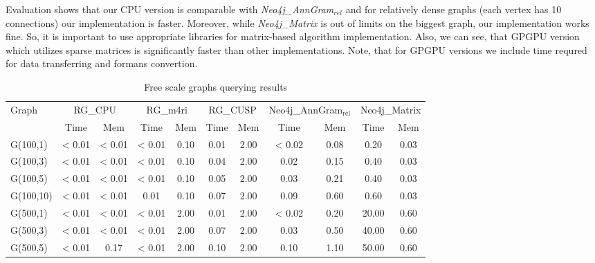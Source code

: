 Evaluation shows that our CPU version is comparable with \textit{Neo4j\_AnnGram$_{\textit{rel}}$} and for relatively dense graphs (each vertex has 10 connections) our implementation is faster. Moreover, while \textit{Neo4j\_Matrix} is out of limits on the biggest graph, our implementation works fine.
So, it is important to use appropriate libraries for matrix-based algorithm implementation.
Also, we can see, that GPGPU version which utilizes sparse matrices is significantly faster than other implementations.
Note, that for GPGPU versions we include time requred for data transferring and formans convertion.

\begin{table*}
\caption{Free scale graphs querying results}
\label{tbl:tableFreeScale}
\begin{tabular}{| l | c  c | c  c | c  c | c  c | c  c |}
    \hline
    \multirow{2}{*}{Graph} & \multicolumn{2}{|c|}{RG\_CPU} & \multicolumn{2}{|c|}{RG\_m4ri} & \multicolumn{2}{|c|}{RG\_CUSP} &\multicolumn{2}{|c|}{Neo4j\_AnnGram$_{\text{rel}}$} &\multicolumn{2}{|c|}{Neo4j\_Matrix} \\
    \cline{2-11}
                  & Time     & Mem             & Time   & Mem          & Time     & Mem         & Time    & Mem         & Time    & Mem\\
    \hline
    \hline
    G(100,1)      & < 0.01  & < 0.01           & < 0.01  & 0.10        & 0.01   & 2.00          & < 0.02  & 0.08      & 0.20     & 0.03  \\
    G(100,3)      & < 0.01  & < 0.01           & < 0.01  & 0.10        & 0.04   & 2.00          & 0.02    & 0.15      & 0.40     & 0.03  \\
    G(100,5)      & < 0.01  & < 0.01           & < 0.01  & 0.10        & 0.05   & 2.00          & 0.03    & 0.21      & 0.40     & 0.03  \\
    G(100,10)     & < 0.01  & < 0.01           & 0.01    & 0.10        & 0.07   & 2.00          & 0.09    & 0.60      & 0.60     & 0.03  \\
    \hline
    G(500,1)      & < 0.01  & < 0.01           & < 0.01  & 2.00        & 0.01   & 2.00          & < 0.02  & 0.20      & 20.00    & 0.60   \\
    G(500,3)      & < 0.01  & < 0.01           & < 0.01  & 2.00        & 0.07   & 2.00          & 0.03    & 0.50      & 40.00    & 0.60   \\
    G(500,5)      & < 0.01  & 0.17             & < 0.01  & 2.00        & 0.10   & 2.00          & 0.10    & 1.10      & 50.00    & 0.60   \\

\end{tabular}
\end{table*}
